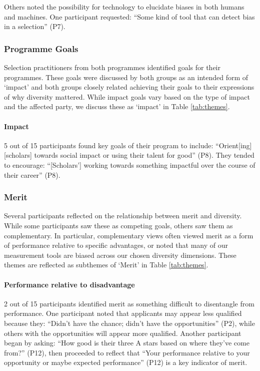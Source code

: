 Others noted the possibility for technology to elucidate biases in both humans and machines. One participant requested: ``Some kind of tool that can detect bias in a selection'' (P7).

\subsubsection{Programme Goals}
Selection practitioners from both programmes identified goals for their programmes. These goals were discussed by both groups as an intended form of `impact' and both groups closely related achieving their goals to their expressions of why diversity mattered. While impact goals vary based on the type of impact and the affected party, we discuss these as `impact' in Table \ref{tab:themes}.

\paragraph{Impact}
5 out of 15 participants found key goals of their program to include: ``Orient[ing] [scholars] towards social impact or using their talent for good'' (P8). They tended to encourage: ``[Scholars'] working towards something impactful over the course of their career'' (P8).

\subsubsection{Merit}
Several participants reflected on the relationship between merit and diversity. While some participants saw these as competing goals, others saw them as complementary. In particular, complementary views often viewed merit as a form of performance relative to specific advantages, or noted that many of our measurement tools are biased across our chosen diversity dimensions. These themes are reflected as subthemes of `Merit' in Table \ref{tab:themes}.

\paragraph{Performance relative to disadvantage}
2 out of 15 participants identified merit as something difficult to disentangle from performance. One participant noted that applicants may appear less qualified because they: ``Didn't have the chance; didn't have the opportunities'' (P2), while others with the opportunities will appear more qualified. Another participant began by asking: ``How good is their three A stars based on where they've come from?'' (P12), then proceeded to reflect that ``Your performance relative to your opportunity or maybe expected performance'' (P12) is a key indicator of merit.


